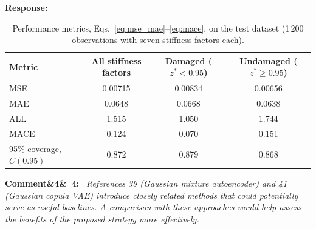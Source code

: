 \documentclass[11pt]{article}
\newenvironment{rcomment}[1]{\par\bigskip\noindent\textbf{Comment\ifx&#1&\else\ #1\fi:}\ \itshape}{\par}
\newenvironment{response}{\par\smallskip\noindent\color{resp}\textbf{Response:}\ }{\par}
\begin{document}
\begin{response}
	\begin{table}[H]
		\centering\small
		\caption{Performance metrics, Eqs.~\eqref{eq:mse_mae}--\eqref{eq:mace}, on the test dataset (1\,200 observations with seven
			stiffness factors each).}
		\label{tab:metricsB}
		\begin{tabular}{lccc}
			\toprule
			Metric & All stiffness factors & Damaged ($z^*<0.95$) & Undamaged ($z^*\ge0.95$) \\
			\midrule
			MSE & 0.00715 & 0.00834 & 0.00656 \\
			MAE & 0.0648 & 0.0668 & 0.0638 \\
			ALL & 1.515 & 1.050 & 1.744 \\
			MACE & 0.124 & 0.070 & 0.151 \\
			95\% coverage, $C(0.95)$ & 0.872 & 0.879 & 0.868 \\
			\bottomrule
		\end{tabular}
	\end{table}
\end{response}


%

\begin{rcomment}{4}
References 39 (Gaussian mixture autoencoder) and 41 (Gaussian copula VAE) introduce closely related methods that could
potentially serve as useful baselines. A comparison with these approaches would help assess the benefits of the proposed
strategy more effectively.
\end{rcomment}
\end{document}
